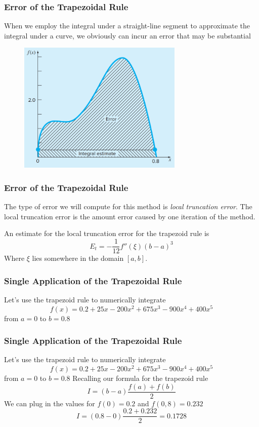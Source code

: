 \documentclass{if-beamer}
\begin{document}
\begin{frame}
	\frametitle{Error of the Trapezoidal Rule}
	When we employ the integral under a straight-line segment to approximate the integral
	under a curve, we obviously can incur an error that may be substantial 
	\begin{figure}
		\centering
		\includegraphics[width=0.7\textwidth]{figures/error}
	\end{figure}
\end{frame}

\begin{frame}
	\frametitle{Error of the Trapezoidal Rule}
	The type of error we will compute for this method is \textit{local truncation error}. The local truncation error is the amount error caused by one iteration of the method.\\\vspace{10pt}
	
	An estimate for the local truncation error for the trapezoid rule is 
	$$E_t =-\frac{1}{12}f''(\xi)(b-a)^3$$
	Where $\xi$ lies somewhere in the domain $[a,b]$. \\\vspace{10pt} 
\end{frame}

\begin{frame}
	\frametitle{Single Application of the Trapezoidal Rule}
	Let's use the trapezoid rule to numerically integrate
	$$f(x) =0.2+25x-200x^2+675x^3-900x^4+400x^5$$
	from $a = 0$ to $b=0.8$
\end{frame}

\begin{frame}
	\frametitle{Single Application of the Trapezoidal Rule}
	Let's use the trapezoid rule to numerically integrate
	$$f(x) =0.2+25x-200x^2+675x^3-900x^4+400x^5$$
	from $a = 0$ to $b=0.8$
	Recalling our formula for the trapezoid rule
	$$I = (b-a)\frac{f(a)+f(b)}{2}$$
	We can plug in the values for $f(0) = 0.2$
	and $f(0,8) = 0.232$
	$$I = (0.8-0)\frac{0.2+0.232}{2} = 0.1728$$
	
\end{frame}
\end{document}
